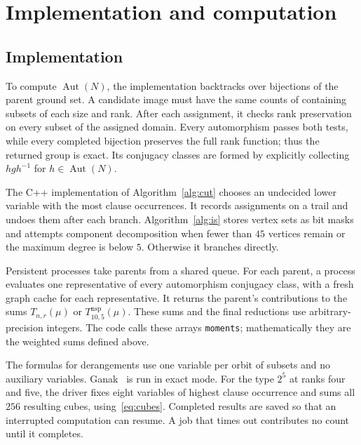\documentclass[11pt]{article}
\theoremstyle{definition}
\DeclareMathOperator{\Aut}{Aut}
\newcommand{\nsp}{\mathrm{nsp}}
\begin{document}
\section{Implementation and computation}

\subsection{Implementation}\label{sec:implementation}

To compute $\Aut(N)$, the implementation backtracks over bijections of the parent
ground set. A candidate image must have the same counts of containing
subsets of each size and rank. After each assignment, it checks rank
preservation on every subset of the assigned domain. Every automorphism
passes both tests, while every completed bijection preserves the full rank
function; thus the returned group is exact. Its conjugacy classes are
formed by explicitly collecting $hgh^{-1}$ for $h\in\Aut(N)$.

The C++ implementation of Algorithm~\ref{alg:cut} chooses an undecided
lower variable with the most clause occurrences. It records assignments
on a trail and undoes them after each branch. Algorithm~\ref{alg:is}
stores vertex sets as bit masks and attempts component decomposition when
fewer than $45$ vertices remain or the maximum degree is below $5$.
Otherwise it branches directly.

Persistent processes take parents from a shared queue. For each parent,
a process evaluates one representative of every automorphism conjugacy
class, with a fresh graph cache for each representative. It returns the
parent's contributions to the sums $T_{n,r}(\mu)$ or
$T^{\nsp}_{10,5}(\mu)$. These sums and the final reductions use
arbitrary-precision integers. The code calls these arrays \texttt{moments};
mathematically they are the weighted sums defined above.

The formulas for derangements use one variable per orbit of subsets and no auxiliary
variables. Ganak~\cite{Ganak} is run in exact mode. For the type $2^5$ at
ranks four and five, the driver fixes eight variables of highest clause
occurrence and sums all $256$ resulting cubes, using~\eqref{eq:cubes}.
Completed results are saved so that an interrupted computation can resume.
A job that times out contributes no count until it completes.
\end{document}
